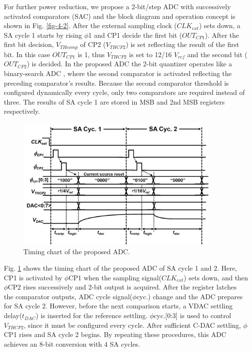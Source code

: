 For further power reduction, we propose a 2-bit/step ADC with successively activated comparators (SAC) and the block diagram and operation concept is shown in Fig. \ref{fig-4-2}. After the external sampling clock ($CLK_{ext}$) sets down, a SA cycle 1 starts by rising $\phi$1 and CP1 decide the first bit ($OUT_{CP1}$). After the first bit decision, $V_{THcomp}$ of CP2 ($V_{THCP2}$) is set reflecting the result of the first bit. In this case $OUT_{CP1}$ is 1, thus $V_{THCP2}$ is set to 12/16 $V_{ref}$ and the second bit ($OUT_{CP2}$) is decided. In the proposed ADC the 2-bit quantizer operates like a binary-search ADC \cite{van2008150}, where the second comparator is activated reflecting the preceding comparator’s results. Because the second comparator threshold is configured dynamically every cycle, only two comparators are required instead of three. 
The results of SA cycle 1 are stored in MSB and 2nd MSB registers respectively.

\begin{figure}
\centering
  \includegraphics[width=0.9\textwidth]{figure/chap4/fig3.jpg}
  \caption{Timing chart of the proposed ADC.}
  \label{fig-4-3}
\end{figure}

Fig. \ref{fig-4-3} shows the timing chart of the proposed ADC of SA cycle 1 and 2. Here, CP1 is activated by $\phi$CP1 when the sampling signal($CLK_{ext}$) sets down, and then $\phi$CP2 rises successively and 2-bit output is acquired. After the register latches the comparator outputs, ADC cycle signal($\phi$cyc.) change and the ADC prepares for SA cycle 2. However, before the next comparison starts, a VDAC settling delay($t_{DAC}$) is inserted for the reference settling. $\phi$cyc.[0:3] is used to control $V_{THCP2}$, since it must be configured every cycle. After sufficient C-DAC settling, $\phi$CP1 rises and SA cycle 2 begins. By repeating these procedures, this ADC achieves an 8-bit conversion with 4 SA cycles.


